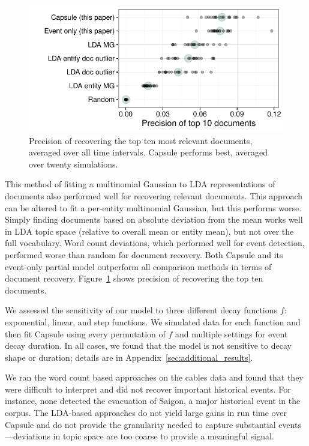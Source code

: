 
\begin{figure}[h]
\centering
\includegraphics[width=\linewidth]{fig/precision10.pdf}
\caption{Precision of recovering the top ten most relevant documents, averaged over all time intervals.  Capsule performs best, averaged over twenty simulations.}
\label{fig:sim_precision}
\end{figure}

This method of fitting a multinomial Gaussian to LDA representations of documents also performed well for recovering relevant documents.  This approach can be altered to fit a per-entity multinomial Gaussian, but this performs worse.  Simply finding documents based on absolute deviation from the mean works well in LDA topic space (relative to overall mean or entity mean), but not over the full vocabulary.  Word count deviations, which performed well for event detection, performed worse than random for document recovery.  Both Capsule and its event-only partial model outperform all comparison methods in terms of document recovery.  Figure~\ref{fig:sim_precision} shows precision of recovering the top ten documents.


We assessed the sensitivity of our model to three different decay functions $f$: exponential, linear, and step functions.  We simulated data for each function and then fit Capsule using every permutation of $f$ and multiple settings for event decay duration.  In all cases, we found that the model is not sensitive to decay shape or duration; details are in Appendix~\ref{sec:additional_results}.

We ran the word count based approaches on the cables data and found that they were difficult to interpret and did not recover important historical events.  For instance, none detected the evacuation of Saigon, a major historical event in the corpus.  The LDA-based approaches do not yield large gains in run time over Capsule and do not provide the granularity needed to capture substantial events---deviations in topic space are too coarse to provide a meaningful signal.
